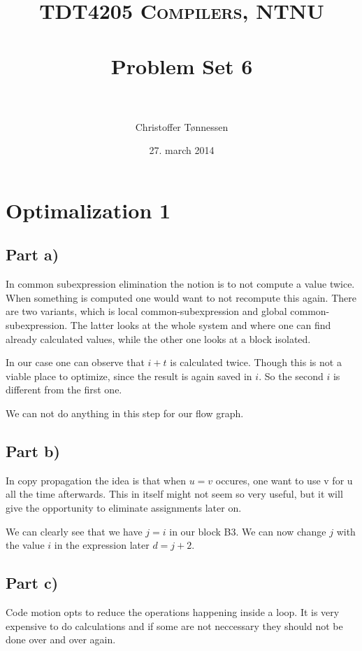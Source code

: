 \documentclass[paper=a4, fontsize=11pt]{scrartcl} %
\title{ 
\normalfont \normalsize 
\textsc{TDT4205 Compilers, NTNU} \\ [25pt] %
\horrule{0.5pt} \\[0.4cm] %
\huge Problem Set 6 \\ %
\horrule{2pt} \\[0.5cm] %
}
\author{Christoffer Tønnessen} %
\date{\normalsize27. march 2014} %
\numberwithin{equation}{section} %
\numberwithin{figure}{section} %
\numberwithin{table}{section} %
\begin{document}
\maketitle %

\section{Optimalization 1}

\subsection{Part a)}
In common subexpression elimination the notion is to not compute a value twice.
When something is computed one would want to not recompute this again.
There are two variants, which is local common-subexpression and global common-subexpression.
The latter looks at the whole system and where one can find already calculated values, while the other one looks at a block isolated.

In our case one can observe that $ i + t $ is calculated twice.
Though this is not a viable place to optimize, since the result is again saved in $i$.
So the second $i$ is different from the first one.

We can not do anything in this step for our flow graph.

\subsection{Part b)}
In copy propagation the idea is that when $ u = v $ occures, one want to use v for u all the time afterwards.
This in itself might not seem so very useful, but it will give the opportunity to eliminate assignments later on.

We can clearly see that we have $ j = i $ in our block B3. We can now change $j$ with the value $i$ in the expression later $ d = j + 2 $.

\subsection{Part c)}
Code motion opts to reduce the operations happening inside a loop.
It is very expensive to do calculations and if some are not neccessary they should not be done over and over again.
\end{document}
